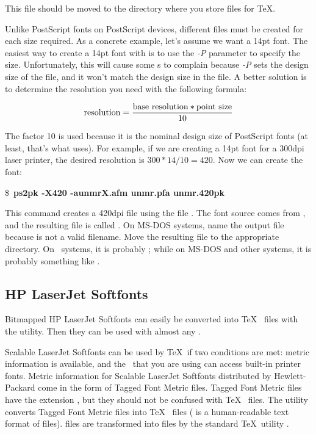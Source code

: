 This  file should be moved to the directory where you store 
files for \TeX.  

Unlike PostScript fonts on PostScript devices, different  files must
be created for each size required.  As a concrete example, let's assume we
want a 14pt font.
The easiest way to create a 14pt font with  is to use the
\textit{-P} parameter to specify the size.  Unfortunately, this will
cause some \dvidriver{}s to complain because \textit{-P} sets the design
size of the  file, and it won't match the design size in the 
file.  A better solution is to determine the resolution you need with the
following formula: 

$$\hbox{resolution} = {{\hbox{base resolution} * \hbox{point size}}\over{10}}$$

The factor 10 is used because it is the nominal design size of PostScript
fonts (at least, that's what   uses).  For example, if
we are creating a 14pt font for a 300dpi laser printer, the desired resolution
is $300*14/10 = 420$.  Now we can create the font:

\begin{ttindent}
\$\ \textbf{ps2pk -X420 -aunmrX.afm unmr.pfa unmr.420pk}
\end{ttindent}

This command creates a 420dpi  file using the  file
.  The font source comes from , and
the resulting  file is called .  On MS-DOS
systems, name the output  file  because
 is not a valid filename.  Move the resulting 
file to the appropriate directory.  On \Unix\ systems, it is probably
; while on MS-DOS and other systems,
it is probably something like .

\subsection{HP LaserJet Softfonts}

Bitmapped HP LaserJet Softfonts can 
easily be converted into \TeX\
 files with the  utility.  Then they can
be used with almost any \dvidriver.

Scalable LaserJet Softfonts can be used by \TeX\ if two conditions are
met: metric information is available, and the \dvidriver\ that you are
using can access built-in printer fonts.  Metric information for Scalable
LaserJet Softfonts distributed by Hewlett-Packard come in
the form of Tagged Font Metric files.  Tagged Font Metric files 
have the extension , but they should not be confused
with \TeX\ \ext{TFM} files.  The utility  converts
Tagged Font Metric files into \TeX\  files ( is
a human-readable text format of  files).  \ext{PL} files
are transformed into \ext{TFM} files by the standard \TeX\ utility
\program{PLtoTF}.

